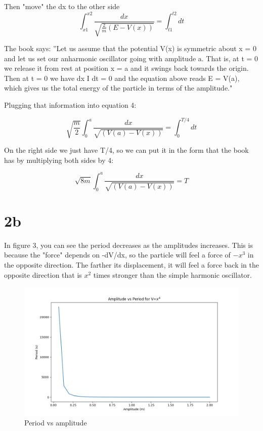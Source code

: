 \documentclass{article}
\begin{document}
Then "move" the dx to the other side
\begin{equation}
   \int_{x1}^{x2}\frac{dx}{\sqrt{ \frac{2}{m}(E-V(x)) }}=\int_{t1}^{t2}dt
\end{equation}

The book says: ''Let us assume that the potential V(x) is symmetric about x = 0 and let us set our anharmonic oscillator going with amplitude a. That is, at t = 0 we release it from rest at position x = a and it swings back towards the origin. Then at t = 0 we have dx I dt = 0 and the equation above reads E = V(a), which gives us the total energy of the particle in terms of the amplitude."
\par Plugging that information into equation 4: 



\begin{equation}
  \sqrt{\frac{m}{2}} \int_0^a \frac{dx}{\sqrt{ (V(a)-V(x)) }}=\int_{0}^{T/4}dt
\end{equation}

On the right side we just have T/4, so we can put it in the form that the book has by multiplying both sides by 4:

\begin{equation}
  \sqrt{8m} \int_0^a \frac{dx}{\sqrt{ (V(a)-V(x)) }}=T
\end{equation}

\section{2b}

In figure 3, you can see the period decreases as the amplitudes increases. This is because the "force" depends on -dV/dx, so the particle will feel a force of $-x^3$ in the opposite direction. The farther its displacement, it will feel a force back in the opposite direction that is $x^2$ times stronger than the simple harmonic oscillator.
\begin{figure}[h!]
    \centering
    \includegraphics[width=\linewidth]{ps-4-2.png}
    \caption{Period vs amplitude}
    \label{Anharmonic Oscilator Period vs amplitude}
\end{figure}
\end{document}
